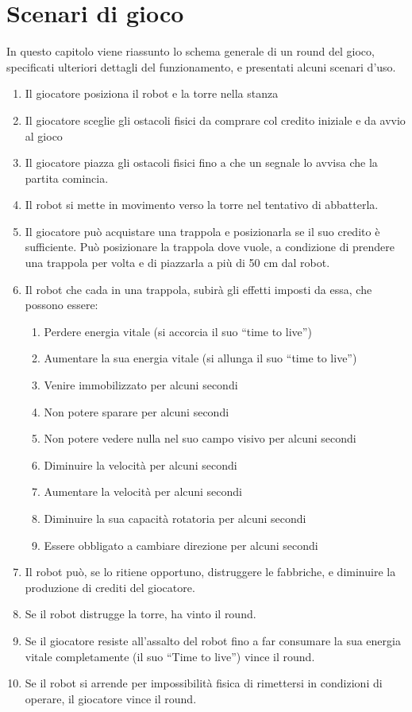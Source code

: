 \chapter{Scenari di gioco}
\label{cap:scenari}

In questo capitolo viene riassunto lo schema generale di un round del gioco, specificati ulteriori dettagli del funzionamento, e presentati alcuni scenari d'uso.

\begin{enumerate}
    \item Il giocatore posiziona il robot e la torre nella stanza
	\item Il giocatore sceglie gli ostacoli fisici da comprare col credito iniziale e da avvio al gioco
	\item Il giocatore piazza gli ostacoli fisici fino a che un segnale lo avvisa che la partita comincia.
	\item Il robot si mette in movimento verso la torre nel tentativo di abbatterla.
	\item Il giocatore può acquistare una trappola e posizionarla se il suo credito è sufficiente. Può posizionare la trappola dove vuole, a condizione di prendere una trappola per volta e di piazzarla a più di 50 cm dal robot.
	\item Il robot che cada in una trappola, subirà gli effetti imposti da essa, che possono essere:
		\begin{enumerate}
		\item Perdere energia vitale (si accorcia il suo “time to live”)
		\item Aumentare la sua energia vitale (si allunga il suo “time to live”)
		\item Venire immobilizzato per alcuni secondi
		\item Non potere sparare per alcuni secondi
		\item Non potere vedere nulla nel suo campo visivo per alcuni secondi
		\item Diminuire la velocità per alcuni secondi
		\item Aumentare la velocità per alcuni secondi
		\item Diminuire la sua capacità rotatoria per alcuni secondi
		\item Essere obbligato a cambiare direzione per alcuni secondi
		\end{enumerate}
	\item Il robot può, se lo ritiene opportuno, distruggere le fabbriche, e diminuire la produzione di crediti del giocatore.
	\item Se il robot distrugge la torre, ha vinto il round.
	\item Se il giocatore resiste all’assalto del robot fino a far consumare la sua energia vitale completamente (il suo “Time to live”) vince il round.
	\item Se il robot si arrende per impossibilità fisica di rimettersi in condizioni di operare, il giocatore vince il round.
	\end{enumerate}

